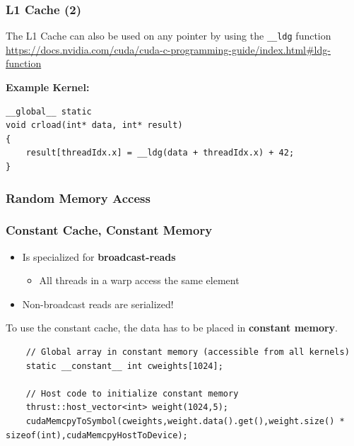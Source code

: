 \documentclass[aspectratio=169,handout]{beamer}
\begin{document}
\begin{frame}[fragile]
	\frametitle{L1 Cache (2)}
	The L1 Cache can also be used on any pointer by using the \texttt{\_\_ldg} function\\
	\url{https://docs.nvidia.com/cuda/cuda-c-programming-guide/index.html#ldg-function}

	\textbf{Example Kernel:}
	\begin{lstlisting}
__global__ static
void crload(int* data, int* result)
{
	result[threadIdx.x] = __ldg(data + threadIdx.x) + 42;
}
	\end{lstlisting}
\end{frame}


\begin{frame}[fragile]
\frametitle{Random Memory Access}
\begin{figure}[!h]
\end{figure}
\end{frame}


\begin{frame}[fragile]
	\frametitle{Constant Cache, Constant Memory}
	\begin{itemize}
		\item Is specialized for \textbf{broadcast-reads}
		\begin{itemize}
			\item All threads in a warp access the same element
		\end{itemize}
		\item Non-broadcast reads are serialized!
	\end{itemize}
	To use the constant cache, the data has to be placed in \textbf{constant memory}.
	\begin{lstlisting}
	// Global array in constant memory (accessible from all kernels)
	static __constant__ int cweights[1024];

	// Host code to initialize constant memory
	thrust::host_vector<int> weight(1024,5);
	cudaMemcpyToSymbol(cweights,weight.data().get(),weight.size() * 	   sizeof(int),cudaMemcpyHostToDevice);
	\end{lstlisting}
	

\end{frame}
\end{document}
